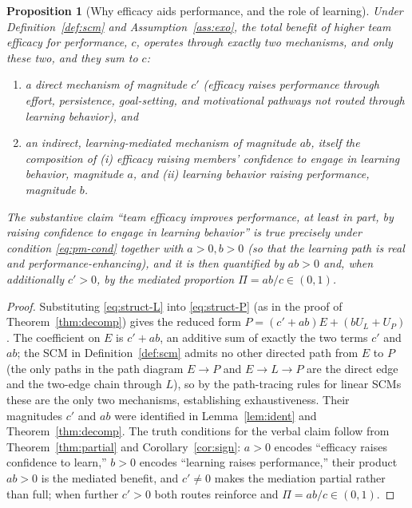 \documentclass{amsart}
\newtheorem{proposition}{Proposition}
\theoremstyle{definition}
\begin{document}
\begin{proposition}[Why efficacy aids performance, and the role of learning]
\label{prop:mech}
Under Definition~\ref{def:scm} and Assumption~\ref{ass:exo}, the total benefit
of higher team efficacy for performance, $c$, operates through exactly two
mechanisms, and only these two, and they sum to $c$:
\begin{enumerate}
\item a \emph{direct} mechanism of magnitude $c'$ (efficacy raises performance
through effort, persistence, goal-setting, and motivational pathways not routed
through learning behavior), and
\item an \emph{indirect, learning-mediated} mechanism of magnitude $ab$, itself
the composition of (i) efficacy raising members' confidence to engage in
learning behavior, magnitude $a$, and (ii) learning behavior raising
performance, magnitude $b$.
\end{enumerate}
The substantive claim ``team efficacy improves performance, at least in part,
by raising confidence to engage in learning behavior'' is true precisely under
condition \eqref{eq:pm-cond} together with $a>0,b>0$ (so that the learning path
is real and performance-enhancing), and it is then quantified by $ab>0$ and,
when additionally $c'>0$, by the mediated proportion $\Pi=ab/c\in(0,1)$.
\end{proposition}

\begin{proof}
Substituting \eqref{eq:struct-L} into \eqref{eq:struct-P} (as in the proof of
Theorem~\ref{thm:decomp}) gives the reduced form
$P=(c'+ab)E+(bU_L+U_P)$. The coefficient on $E$ is $c'+ab$, an additive sum of
exactly the two terms $c'$ and $ab$; the SCM in Definition~\ref{def:scm} admits
no other directed path from $E$ to $P$ (the only paths in the path diagram
$E\!\to\!P$ and $E\!\to\!L\!\to\!P$ are the direct edge and the two-edge chain
through $L$), so by the path-tracing rules for linear SCMs these are the only
two mechanisms, establishing exhaustiveness. Their magnitudes $c'$ and $ab$
were identified in Lemma~\ref{lem:ident} and Theorem~\ref{thm:decomp}. The
truth conditions for the verbal claim follow from Theorem~\ref{thm:partial} and
Corollary~\ref{cor:sign}: $a>0$ encodes ``efficacy raises confidence to learn,''
$b>0$ encodes ``learning raises performance,'' their product $ab>0$ is the
mediated benefit, and $c'\neq0$ makes the mediation partial rather than full;
when further $c'>0$ both routes reinforce and $\Pi=ab/c\in(0,1)$.
\end{proof}
\end{document}
